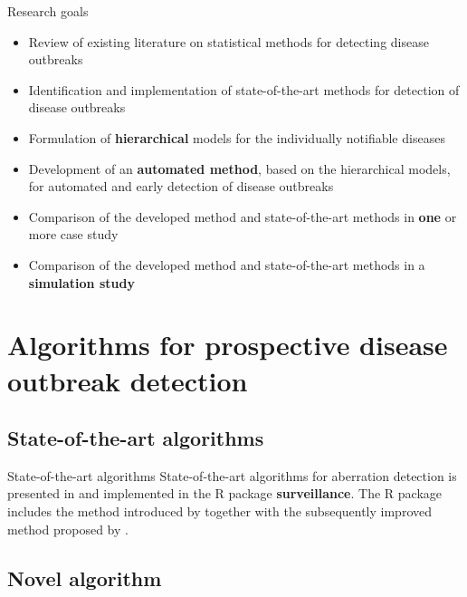 \documentclass[aspectratio=169]{beamer}
\begin{document}
\begin{frame}{Research goals}
\begin{itemize}
  \item<1> Review of existing literature on statistical methods for detecting disease outbreaks
  \item<1>  Identification and implementation of state-of-the-art methods for detection of disease outbreaks
  \item<1-2> Formulation of \textbf<2>{hierarchical} models for the individually notifiable diseases
  \item<1-2> Development of an \textbf<2>{automated method}, based on the hierarchical models, for automated and early detection of disease outbreaks
  \item<1-2> Comparison of the developed method and state-of-the-art methods in \textbf<2>{one} or more case study
  \item<1-2> Comparison of the developed method and state-of-the-art methods in a \textbf<2>{simulation study}
\end{itemize}
\end{frame}

\hypertarget{algorithms-for-prospective-disease-outbreak-detection}{%
\section{Algorithms for prospective disease outbreak
detection}\label{algorithms-for-prospective-disease-outbreak-detection}}

\hypertarget{state-of-the-art-algorithms}{%
\subsection{State-of-the-art
algorithms}\label{state-of-the-art-algorithms}}

\begin{frame}{State-of-the-art algorithms}
State-of-the-art algorithms for aberration detection is presented in
\cite{Salmon_2016} and implemented in the R package
\textbf{surveillance}. The R package includes the method introduced by
\cite{Farrington_1996} together with the subsequently improved method
proposed by \cite{Noufaily_2013}.
\end{frame}

\hypertarget{novel-algorithm}{%
\subsection{Novel algorithm}\label{novel-algorithm}}
\end{document}
